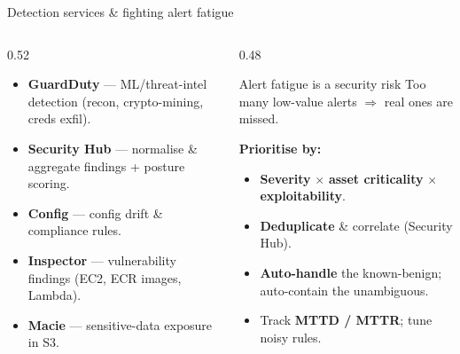 \documentclass[aspectratio=169,10pt]{beamer}
\newcommand{\svc}[1]{{\color{accent}\textsf{\textbf{#1}}}}      %
\newcommand{\term}[1]{{\color{awsink}\textbf{#1}}}
\begin{document}
\begin{frame}{Detection services \& fighting alert fatigue}
  \begin{columns}[T]
    \begin{column}{0.52\textwidth}\footnotesize
      \begin{itemize}
        \item \svc{GuardDuty} --- ML/threat-intel detection (recon, crypto-mining, creds exfil).
        \item \svc{Security Hub} --- normalise \& aggregate findings + posture scoring.
        \item \svc{Config} --- config drift \& compliance rules.
        \item \svc{Inspector} --- vulnerability findings (EC2, ECR images, Lambda).
        \item \svc{Macie} --- sensitive-data exposure in S3.
      \end{itemize}
    \end{column}
    \begin{column}{0.48\textwidth}
      \begin{alertblock}{\footnotesize Alert fatigue is a security risk}
        \footnotesize Too many low-value alerts $\Rightarrow$ real ones are missed.
      \end{alertblock}
      \textbf{\footnotesize Prioritise by:}
      \begin{itemize}\footnotesize
        \item \term{Severity} $\times$ \term{asset criticality} $\times$ \term{exploitability}.
        \item \term{Deduplicate} \& correlate (Security Hub).
        \item \term{Auto-handle} the known-benign; auto-contain the unambiguous.
        \item Track \term{MTTD / MTTR}; tune noisy rules.
      \end{itemize}
    \end{column}
  \end{columns}
\end{frame}
\end{document}
